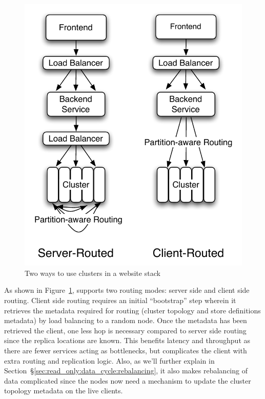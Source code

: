 \begin{figure}
  \centering
    \includegraphics[scale=0.45]{images/fullstack.pdf}
  \caption{Two ways to use \projectname{} clusters in a website stack}
  \label{fullstack}
\end{figure}

\noindent 
As shown in Figure~\ref{fullstack}, \projectname{} supports two
routing modes: server side and client side routing. Client side
routing requires an initial ``bootstrap'' step wherein it retrieves
the metadata required for routing (cluster topology and store
definitions metadata) by load balancing to a random node. Once the
metadata has been retrieved the client, one less hop is necessary
compared to server side routing since the replica locations are known.
This benefits latency and throughput as there are fewer services
acting as bottlenecks, but complicates the client with extra routing
and replication logic. Also, as we'll further explain in
Section~\S\ref{sec:read_only:data_cycle:rebalancing}, it also makes
rebalancing of data complicated since the \projectname{} nodes now
need a mechanism to update the cluster topology metadata on the live
clients. 


